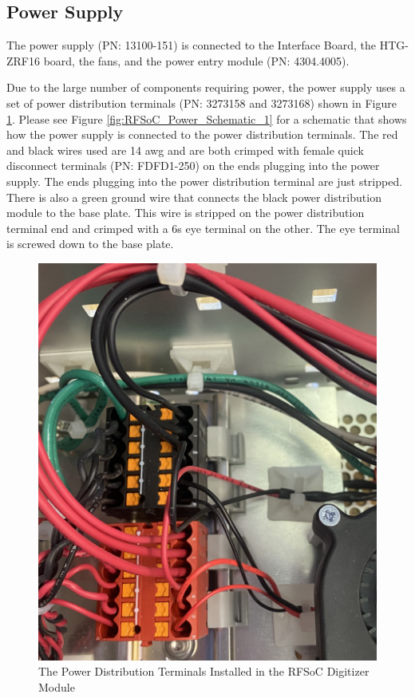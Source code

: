 \documentclass[12pt,a4paper,oneside]{article}
\begin{document}
\subsection{Power Supply}
\label{sec: the 6.5}

The power supply (PN: 13100-151) is connected to the Interface Board, the HTG-ZRF16 board, the fans, and the power entry module (PN: 4304.4005). 

Due to the large number of components requiring power, the power supply uses a set of power distribution terminals (PN: 3273158 and 3273168) shown in Figure \ref{fig:Power_Distribution Terminals}. Please see Figure \ref{fig:RFSoC_Power_Schematic_1} for a schematic that shows how the power supply is connected to the power distribution terminals. The red and black wires used are 14 awg and are both crimped with female quick disconnect terminals (PN: FDFD1-250) on the ends plugging into the power supply. The ends plugging into the power distribution terminal are just stripped. There is also a green ground wire that connects the black power distribution module to the base plate. This wire is stripped on the power distribution terminal end and crimped with a 6s eye terminal on the other. The eye terminal is screwed down to the base plate.

\begin{figure}[H]
\centering
\includegraphics[width=.8\linewidth]{figures/Power_Distribution_Terminals.jpeg}
\caption{The Power Distribution Terminals Installed in the RFSoC Digitizer Module}
\label{fig:Power_Distribution Terminals}
\end{figure}
\end{document}
